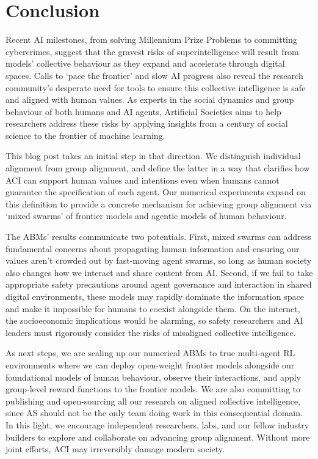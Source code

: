 \section{Conclusion}

Recent AI milestones, from solving Millennium Prize Problems to committing cybercrimes, suggest that the gravest risks of superintelligence will result from models' collective behaviour as they expand and accelerate through digital spaces. Calls to `pace the frontier' and slow AI progress also reveal the research community's desperate need for tools to ensure this collective intelligence is safe and aligned with human values. As experts in the social dynamics and group behaviour of both humans and AI agents, Artificial Societies aims to help researchers address these risks by applying insights from a century of social science to the frontier of machine learning.

This blog post takes an initial step in that direction. We distinguish individual alignment from group alignment, and define the latter in a way that clarifies how ACI can support human values and intentions even when humans cannot guarantee the specification of each agent. Our numerical experiments expand on this definition to provide a concrete mechanism for achieving group alignment via `mixed swarms' of frontier models and agentic models of human behaviour. 

The ABMs' results communicate two potentials. First, mixed swarms can address fundamental concerns about propagating human information and ensuring our values aren't crowded out by fast-moving agent swarms, so long as human society also changes how we interact and share content from AI. Second, if we fail to take appropriate safety precautions around agent governance and interaction in shared digital environments, these models may rapidly dominate the information space and make it impossible for humans to coexist alongside them. On the internet, the socioeconomic implications would be alarming, so safety researchers and AI leaders must rigorously consider the risks of misaligned collective intelligence. 

As next steps, we are scaling up our numerical ABMs to true multi-agent RL environments where we can deploy open-weight frontier models alongside our foundational models of human behaviour, observe their interactions, and apply group-level reward functions to the frontier models. We are also committing to publishing and open-sourcing all our research on aligned collective intelligence, since AS should not be the only team doing work in this consequential domain. In this light, we encourage independent researchers, labs, and our fellow industry builders to explore and collaborate on advancing group alignment. Without more joint efforts, ACI may irreversibly damage modern society. 